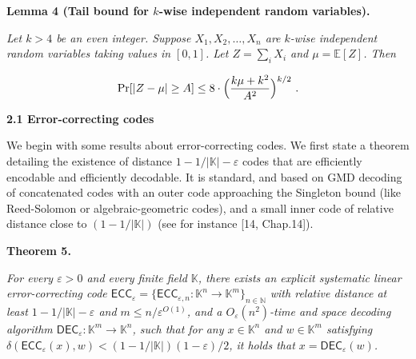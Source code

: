 \par\medskip\noindent\textbf{
\textbf{Lemma 4}\textbf{ }(Tail bound for $k$-wise independent random variables)\textbf{.}
}\par



\emph{Let $k>4$ be an even integer. Suppose
$X_{1},X_{2},\dots,X_{n}$ are $k$-wise independent
random variables taking values in $[0,1]$. Let $Z=\sum_{i}X_{i}$ and $\mu={\mathbb{E}}[Z]$. Then}\par


\[\begin{gathered}
\mathrm{Pr}[|Z-\mu|\geq A]\leq 8\cdot\Bigl{(}\frac{k\mu+k^{2}}{A^{2}}\Bigr{)}^{k/2}\ .
\end{gathered}\]







\par\medskip\noindent\textbf{
2.1 Error-correcting codes}\par




We begin with some results about error-correcting codes. We first state a theorem detailing the existence of distance $1-1/|\mathbb{K}|-\varepsilon$ codes that are efficiently encodable and efficiently decodable. It is standard, and based on GMD decoding of concatenated codes with an outer code approaching the Singleton bound (like Reed-Solomon or algebraic-geometric codes), and a small inner code of relative distance close to $(1-1/|\mathbb{K}|)$ (see for instance [14, Chap.14]).\par





\par\medskip\noindent\textbf{
\textbf{Theorem 5}\textbf{.}
}\par



\emph{For every $\varepsilon>0$ and every finite field $\mathbb{K}$, there exists an explicit systematic linear error-correcting code $\mathsf{ECC}_{\varepsilon}=\{\mathsf{ECC}_{\varepsilon,n}:\mathbb{K}^{n}\rightarrow\mathbb{K}^{m}\}_{n\in\mathbb{N}}$ with relative distance at least $1-1/|\mathbb{K}|-\varepsilon$ and $m\leq n/\varepsilon^{O(1)}$, and a $O_{\varepsilon}(n^{2})$-time and space decoding algorithm $\mathsf{DEC}_{\varepsilon}:\mathbb{K}^{m}\rightarrow\mathbb{K}^{n}$, such that for any $x\in\mathbb{K}^{n}$ and $w\in\mathbb{K}^{m}$ satisfying $\delta(\mathsf{ECC}_{\varepsilon}(x),w)<(1-1/|\mathbb{K}|)(1-\varepsilon)/2$, it holds that $x=\mathsf{DEC}_{\varepsilon}(w)$.}\par



